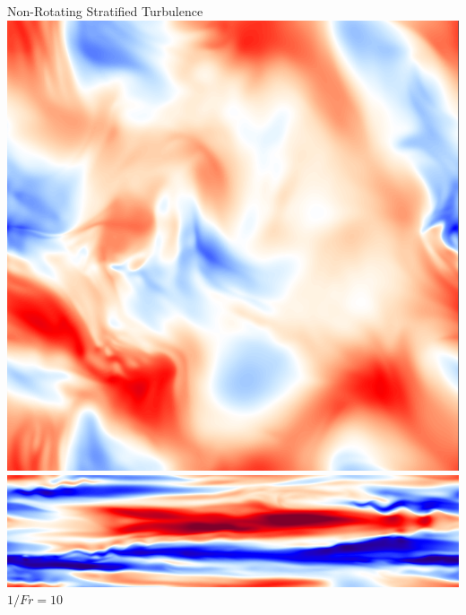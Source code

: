\documentclass[aspecttatio=169]{beamer}
\begin{document}
\begin{frame}{Non-Rotating Stratified Turbulence}
        \includegraphics[width=\textwidth]{images/XYB100ux.png}
        \includegraphics[width=\textwidth]{images/XZB100ux.png}
         \vspace{2pt}
        $1/Fr = 10$
    \emp
    \hspace{1pt}
        \centering
        

\end{frame}
\end{document}
